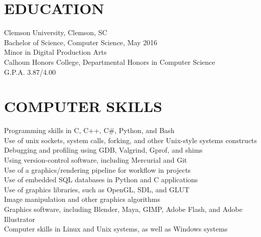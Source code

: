 \documentclass{res}
\begin{document}

\address{\bf  PRESENT ADDRESS\\811 Beverly Dr.\\Summerville, SC 29485\\(843)
         437-7547}
\address{\bf PERMANENT ADDRESS \\ 811 Beverly Dr. \\  Summerville, SC 29485 \\
(843) 437-7547}

\begin{resume}

\section{EDUCATION}          
    Clemson University, Clemson, SC  \\        
    Bachelor of Science, Computer Science, May 2016   \\       
    Minor in Digital Production Arts \\
    Calhoun Honors College, Departmental Honors in Computer
    Science  \\        
    G.P.A. 3.87/4.00

\section{COMPUTER SKILLS}          
    Programming skills in C, C++, C\#, Python, and Bash \\
    Use of unix sockets, system calls, forking, and other Unix-style
    systems constructs \\
    Debugging and profiling using GDB, Valgrind, Gprof, and shims \\
    Using version-control software, including Mercurial and Git \\
    Use of a graphics/rendering pipeline for workflow in projects \\
    Use of embedded SQL databases in Python and C applications \\
    Use of graphics libraries, such as OpenGL, SDL, and GLUT \\
    Image manipulation and other graphics algorithms \\
    Graphics software, including Blender, Maya, GIMP, Adobe Flash, and Adobe
    Illustrator \\
    Computer skills in Linux and Unix systems, as well as Windows systems \\


\end{resume}
\end{document}
